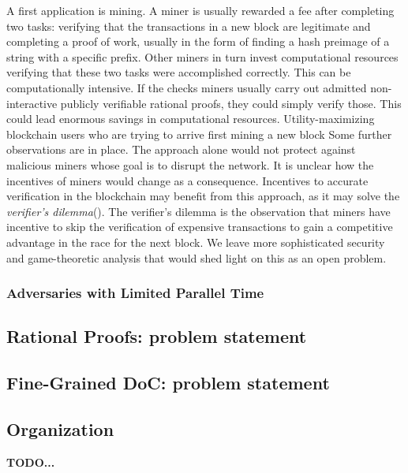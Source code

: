 A first application is mining. A miner is usually rewarded a fee after completing two tasks: verifying that the transactions in a new block are legitimate and completing a proof of work, usually in the form of finding a hash preimage of a string with a specific prefix. Other miners in turn invest computational resources verifying that these two tasks were accomplished correctly. This can be computationally intensive. If the checks miners usually carry out admitted non-interactive publicly verifiable rational proofs, they could simply verify those. This could lead  enormous savings in computational resources. Utility-maximizing blockchain users who are trying to arrive first mining a new block 
Some further observations are in place. The approach alone would not protect against malicious miners whose goal is to disrupt the network. It is unclear how the incentives of miners would change as a consequence. Incentives to accurate verification in the blockchain may benefit from this approach, as it may solve the \textit{verifier's dilemma}(\cite{luu2015demystifying}). The verifier's dilemma is the observation that miners have incentive to skip the verification of expensive transactions to gain a competitive advantage in the race for the next block. We leave more sophisticated security and game-theoretic analysis that would shed light on this as an open problem.



\subsubsection{Adversaries with Limited Parallel Time}






\subsection{Rational Proofs: problem statement}

\subsection{Fine-Grained DoC: problem statement}



\subsection{Organization}
\textbf{TODO...}